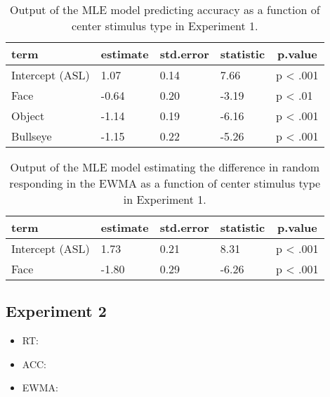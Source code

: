\documentclass[,man,floatsintext]{apa6}
\providecommand{\tightlist}{%
  \setlength{\itemsep}{0pt}\setlength{\parskip}{0pt}}
\begin{document}
\begin{appendix}
\begin{table}[h]
\begin{center}
\begin{threeparttable}
\caption{\label{tab:mle acc trio}Output of the MLE model predicting accuracy as a function of center stimulus type in Experiment 1.}
\begin{tabular}{lllll}
\toprule
term & \multicolumn{1}{c}{estimate} & \multicolumn{1}{c}{std.error} & \multicolumn{1}{c}{statistic} & \multicolumn{1}{c}{p.value}\\
\midrule
Intercept (ASL) & 1.07 & 0.14 & 7.66 & p < .001\\
Face & -0.64 & 0.20 & -3.19 & p < .01\\
Object & -1.14 & 0.19 & -6.16 & p < .001\\
Bullseye & -1.15 & 0.22 & -5.26 & p < .001\\
\bottomrule
\end{tabular}
\end{threeparttable}
\end{center}
\end{table}

\begin{table}[h]
\begin{center}
\begin{threeparttable}
\caption{\label{tab:mle ewma trio prop lang}Output of the MLE model estimating the difference in random responding in the EWMA as a function of center stimulus type in Experiment 1.}
\begin{tabular}{lllll}
\toprule
term & \multicolumn{1}{c}{estimate} & \multicolumn{1}{c}{std.error} & \multicolumn{1}{c}{statistic} & \multicolumn{1}{c}{p.value}\\
\midrule
Intercept (ASL) & 1.73 & 0.21 & 8.31 & p < .001\\
Face & -1.80 & 0.29 & -6.26 & p < .001\\
\bottomrule
\end{tabular}
\end{threeparttable}
\end{center}
\end{table}

\hypertarget{experiment-2}{%
\subsection{Experiment 2}\label{experiment-2}}

\begin{itemize}
\tightlist
\item
RT:
\item
ACC:
\item
EWMA:
\end{itemize}


\end{appendix}
\end{document}
